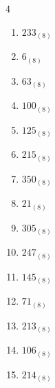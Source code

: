 \begin{multicols}{4}
\begin{enumerate}
  \item $233_{(8)}$

        \phantom{$=155$}

  \item $6_{(8)}$

        \phantom{$=6$}

  \item $63_{(8)}$

        \phantom{$=51$}

  \item $100_{(8)}$

        \phantom{$=64$}

  \item $125_{(8)}$

        \phantom{$=85$}

  \item $215_{(8)}$

        \phantom{$=141$}

  \item $350_{(8)}$

        \phantom{$=232$}

  \item $21_{(8)}$

        \phantom{$=17$}

  \item $305_{(8)}$

        \phantom{$=197$}

  \item $247_{(8)}$

        \phantom{$=167$}

  \item $145_{(8)}$

        \phantom{$=101$}

  \item $71_{(8)}$

        \phantom{$=57$}

  \item $213_{(8)}$

        \phantom{$=139$}

\columnbreak %

\resetques

  \item $106_{(8)}$

        \phantom{$=70$}

  \item $214_{(8)}$

        \phantom{$=140$}


\end{enumerate}
\end{multicols}

